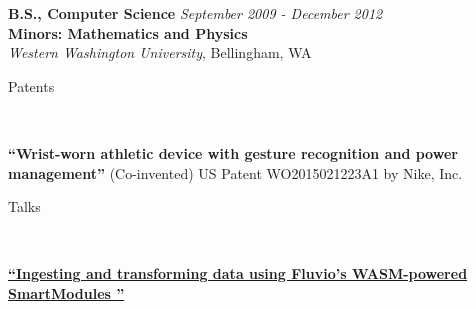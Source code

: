 \documentclass[9pt]{article}
\newenvironment{changemargin}[2]{%
  \begin{list}{}{%
    \setlength{\topsep}{0pt}%
    \setlength{\leftmargin}{#1}%
    \setlength{\rightmargin}{#2}%
    \setlength{\listparindent}{\parindent}%
    \setlength{\itemindent}{\parindent}%
    \setlength{\parsep}{\parskip}%
  }%
  \item[]}{\end{list}
}
\newcommand{\lineover}{
    \begin{changemargin}{-0.05in}{-0.05in}
        \vspace*{-8pt}
        \hrulefill \\
        \vspace*{-2pt}
    \end{changemargin}
}
\newcommand{\header}[1]{
    \begin{changemargin}{-0.5in}{-0.5in}
        {\large #1}\\
        \lineover
    \end{changemargin}
}
\newenvironment{body} {
    \vspace*{-16pt}
    \begin{changemargin}{-0.20in}{-0.5in}
  }
    {\end{changemargin}
}
\begin{document}
\begin{body}
    \vspace{14pt}

    \textbf{B.S., Computer Science}{} \hfill \emph{September 2009 - December 2012}{} \\
    \textbf{Minors: Mathematics and Physics}\\
    \emph{Western Washington University}, Bellingham, WA{} \\
    \medskip


\end{body}

\smallskip



\header{Patents}
\begin{body}
    \vspace{14pt}
    \textbf{``Wrist-worn athletic device with gesture recognition and power management''} (Co-invented) US Patent WO2015021223A1 by Nike, Inc.
\end{body}

\header{Talks}
\begin{body}
    \vspace{14pt}
    \href{https://www.youtube.com/watch?v=1PE9BQL9c_g}{\textbf{``Ingesting and transforming data using Fluvio’s WASM-powered SmartModules ''}}
\end{body}

\smallskip


\end{document}
